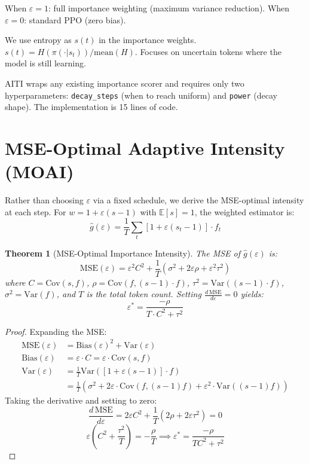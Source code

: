 \documentclass[11pt,a4paper]{article}
\newtheorem{theorem}{Theorem}
\begin{document}
When $\varepsilon = 1$: full importance weighting (maximum variance reduction). When $\varepsilon = 0$: standard PPO (zero bias).


We use entropy as $s(t)$ in the importance weights.  $s(t) = H(\pi(\cdot|s_t)) / \text{mean}(H)$. Focuses on uncertain tokens where the model is still learning.

AITI wraps any existing importance scorer and requires only two hyperparameters: \texttt{decay\_steps} (when to reach uniform) and \texttt{power} (decay shape). The implementation is 15 lines of code.

\section{MSE-Optimal Adaptive Intensity (MOAI)}
\label{sec:moai}

Rather than choosing $\varepsilon$ via a fixed schedule, we derive the MSE-optimal intensity at each step.
For $w = 1 + \varepsilon(s{-}1)$ with $\mathbb{E}[s] = 1$, the weighted estimator is:
\[
\hat{g}(\varepsilon) = \frac{1}{T} \sum_{t} \left[1 + \varepsilon(s_t - 1)\right] \cdot f_t
\]

\begin{theorem}[MSE-Optimal Importance Intensity]
\label{thm:moai}
The MSE of $\hat{g}(\varepsilon)$ is:
\begin{equation}
\text{MSE}(\varepsilon) = \varepsilon^2 C^2 + \frac{1}{T}\left(\sigma^2 + 2\varepsilon\rho + \varepsilon^2 \tau^2\right)
\end{equation}
where $C = \text{Cov}(s, f)$, $\rho = \text{Cov}(f, (s{-}1) \cdot f)$, $\tau^2 = \text{Var}((s{-}1) \cdot f)$, $\sigma^2 = \text{Var}(f)$, and $T$ is the total token count. Setting $\frac{d\,\text{MSE}}{d\varepsilon} = 0$ yields:
\begin{equation}
\label{eq:eps-star}
\boxed{\varepsilon^* = \frac{-\rho}{T \cdot C^2 + \tau^2}}
\end{equation}
\end{theorem}

\begin{proof}
Expanding the MSE:
\begin{align}
\text{MSE}(\varepsilon) &= \text{Bias}(\varepsilon)^2 + \text{Var}(\varepsilon) \\
\text{Bias}(\varepsilon) &= \varepsilon \cdot C = \varepsilon \cdot \text{Cov}(s, f) \\
\text{Var}(\varepsilon) &= \frac{1}{T} \text{Var}\!\left([1 + \varepsilon(s{-}1)] \cdot f\right) \\
&= \frac{1}{T}\left(\sigma^2 + 2\varepsilon \cdot \text{Cov}(f, (s{-}1)f) + \varepsilon^2 \cdot \text{Var}((s{-}1)f)\right)
\end{align}
Taking the derivative and setting to zero:
\[
\frac{d\,\text{MSE}}{d\varepsilon} = 2\varepsilon C^2 + \frac{1}{T}(2\rho + 2\varepsilon\tau^2) = 0
\]
\[
\varepsilon\left(C^2 + \frac{\tau^2}{T}\right) = -\frac{\rho}{T}
\implies \varepsilon^* = \frac{-\rho}{T C^2 + \tau^2}
\]
\end{proof}
\end{document}
